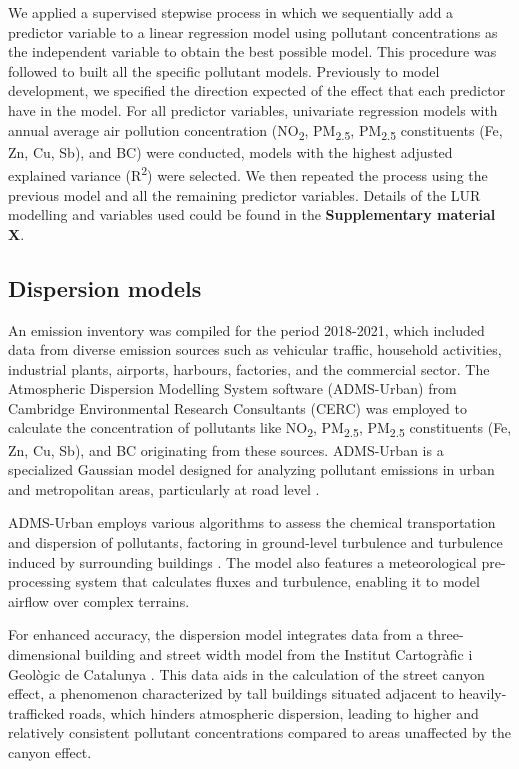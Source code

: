 \documentclass{article}
\begin{document}
We applied a supervised stepwise process in which we sequentially add a predictor variable to a linear regression model using pollutant concentrations as the independent variable to obtain the best possible model. This procedure was followed to built all the specific pollutant models. Previously to model development, we specified the direction expected of the effect that each predictor have in the model. For all predictor variables, univariate regression models with annual average air pollution concentration (NO\textsubscript{2}, PM\textsubscript{2.5}, PM\textsubscript{2.5} constituents (Fe, Zn, Cu, Sb), and BC) were conducted, models with the highest adjusted explained variance (R\textsuperscript{2}) were selected. We then repeated the process using the previous model and all the remaining predictor variables. Details of the LUR modelling and variables used could be found in the \textbf{Supplementary material X}.

\subsection{Dispersion models}

An emission inventory was compiled for the period 2018-2021, which included data from diverse emission sources such as vehicular traffic, household activities, industrial plants, airports, harbours, factories, and the commercial sector. The Atmospheric Dispersion Modelling System software (ADMS-Urban) from Cambridge Environmental Research Consultants (CERC) was employed to calculate the concentration of pollutants like NO\textsubscript{2}, PM\textsubscript{2.5}, PM\textsubscript{2.5} constituents (Fe, Zn, Cu, Sb), and BC originating from these sources. ADMS-Urban is a specialized Gaussian model designed for analyzing pollutant emissions in urban and metropolitan areas, particularly at road level \cite{mchugh1997adms}.

ADMS-Urban employs various algorithms to assess the chemical transportation and dispersion of pollutants, factoring in ground-level turbulence and turbulence induced by surrounding buildings \cite{stocker2012adms}. The model also features a meteorological pre-processing system that calculates fluxes and turbulence, enabling it to model airflow over complex terrains.

For enhanced accuracy, the dispersion model integrates data from a three-dimensional building and street width model from the Institut Cartogràfic i Geològic de Catalunya \cite{stoter2016state, 3Dcity}. This data aids in the calculation of the street canyon effect, a phenomenon characterized by tall buildings situated adjacent to heavily-trafficked roads, which hinders atmospheric dispersion, leading to higher and relatively consistent pollutant concentrations compared to areas unaffected by the canyon effect.
\end{document}
